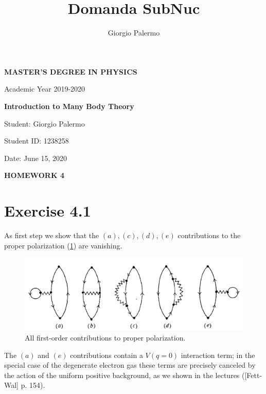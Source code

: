 \documentclass[a4paper]{article}
\title{Domanda SubNuc}
\author{Giorgio Palermo}
\begin{document}
\hypersetup{linkcolor = black}
\hypersetup{linkcolor = blue}

\begin{center}
    \textbf{MASTER'S DEGREE IN PHYSICS}
    
    Academic Year 2019-2020
    
    \medskip
    \textbf{Introduction to Many Body Theory}
\end{center}

\vspace{0.8cm}
Student: Giorgio Palermo

Student ID: 1238258

Date: June 15, 2020

\bigskip

\begin{center}
\textbf{HOMEWORK 4}
\end{center}

\section*{Exercise 4.1}
As first step we show that the $(a), (c), (d), (e)$ contributions to the proper polarization (\ref{fig:first_order}) are vanishing.

\begin{figure}[h]
\centering
\includegraphics[width = .7\textwidth]{First_order.png}
\caption{All first-order contributions to proper polarization.}
\label{fig:first_order}
\end{figure}
The $(a)$ and $(e)$ contributions contain a $V(q=0)$ interaction term; in the special case of the degenerate electron gas these terms are precisely canceled by the action of the uniform positive background, as we shown in the lectures ([Fett-Wal] p. 154).
\end{document}
